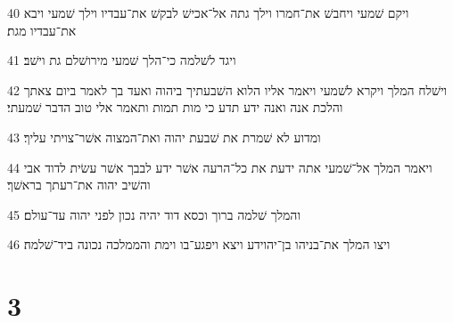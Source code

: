 \par 40 ויקם שׁמעי ויחבשׁ את־חמרו וילך גתה אל־אכישׁ לבקשׁ את־עבדיו וילך שׁמעי ויבא את־עבדיו מגת׃
\par 41 ויגד לשׁלמה כי־הלך שׁמעי מירושׁלם גת וישׁב׃
\par 42 וישׁלח המלך ויקרא לשׁמעי ויאמר אליו הלוא השׁבעתיך ביהוה ואעד בך לאמר ביום צאתך והלכת אנה ואנה ידע תדע כי מות תמות ותאמר אלי טוב הדבר שׁמעתי׃
\par 43 ומדוע לא שׁמרת את שׁבעת יהוה ואת־המצוה אשׁר־צויתי עליך׃
\par 44 ויאמר המלך אל־שׁמעי אתה ידעת את כל־הרעה אשׁר ידע לבבך אשׁר עשׂית לדוד אבי והשׁיב יהוה את־רעתך בראשׁך׃
\par 45 והמלך שׁלמה ברוך וכסא דוד יהיה נכון לפני יהוה עד־עולם׃
\par 46 ויצו המלך את־בניהו בן־יהוידע ויצא ויפגע־בו וימת והממלכה נכונה ביד־שׁלמה׃

\chapter{3}

